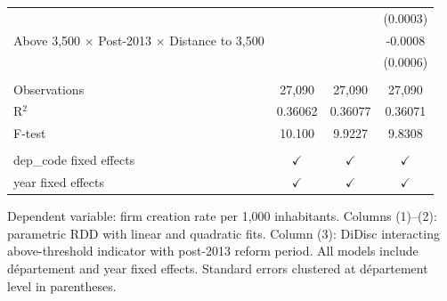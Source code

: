 \begin{table}[htbp]
\begin{tabular}{lccc}
                                                                  &               &                         & (0.0003)\\   
      Above 3,500 $\times$ Post-2013 $\times$ Distance to 3,500   &               &                         & -0.0008\\   
                                                                  &               &                         & (0.0006)\\   
       \\
      Observations                                                & 27,090        & 27,090                  & 27,090\\  
      R$^2$                                                       & 0.36062       & 0.36077                 & 0.36071\\  
      F-test                                                      & 10.100        & 9.9227                  & 9.8308\\  
       \\
      dep\_code fixed effects                                     & $\checkmark$  & $\checkmark$            & $\checkmark$\\   
      year fixed effects                                          & $\checkmark$  & $\checkmark$            & $\checkmark$\\   
      \bottomrule
   \end{tabular}
   
   \par \raggedright 
   Dependent variable: firm creation rate per 1,000 inhabitants. Columns (1)--(2): parametric RDD with linear and quadratic fits. Column (3): DiDisc interacting above-threshold indicator with post-2013 reform period. All models include d\'epartement and year fixed effects. Standard errors clustered at d\'epartement level in parentheses.
\end{table}


